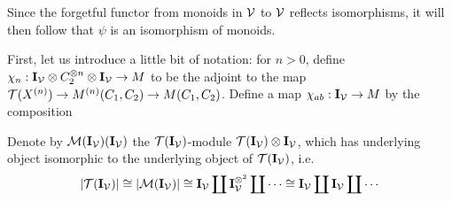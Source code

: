\documentclass[12pt]{amsart}
\begin{document}
Since the forgetful functor from monoids in $\V$ to $\V$ reflects isomorphisms, it will then follow that $\psi$ is an isomorphism of monoids.
\par
First, let us introduce a little bit of notation: for $n > 0$, define $\chi_n : \iv \otimes C_2^{\otimes n} \otimes \iv \to M$ to be the adjoint to the map $\T(X^{(n)}) \to M^{(n)}(C_1,C_2) \to M(C_1,C_2)$. 
Define a map $\chi_{ab}: \iv \to M$ by the composition 
\begin{center}
\end{center} 
Denote by $\miv(\iv)$ the $\tiv$-module $\tiv \otimes \iv $, which has underlying object isomorphic to the underlying object of $\tiv$, i.e.
$$|\tiv| \cong |\miv| \cong \iv \coprod \iv^{\otimes^2} \coprod \cdots \cong \iv \coprod \iv \coprod \cdots$$ 
\end{document}
